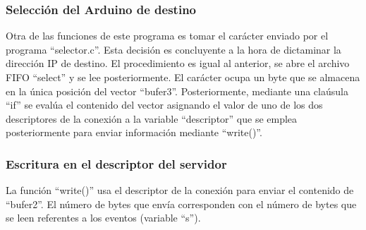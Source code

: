 \subsubsection{Selección del Arduino de destino}\label{s3_5_1_2}

Otra de las funciones de este programa es tomar el carácter enviado por el programa ``selector.c''. Esta decisión es concluyente a la hora de dictaminar la dirección IP de destino. El procedimiento es igual al anterior, se abre el archivo FIFO ``select'' y se lee posteriormente. El carácter ocupa un byte que se almacena en la única posición del vector ``bufer3''. Posteriormente, mediante una claúsula ``if'' se evalúa el contenido del vector asignando el valor de uno de los dos descriptores de la conexión a la variable ``descriptor'' que se emplea posteriormente para enviar información mediante ``write()''.


\subsubsection{Escritura en el descriptor del servidor}\label{s3_5_1_3}

La función ``write()'' usa el descriptor de la conexión para enviar el contenido de ``bufer2''. El número de bytes que envía corresponden con el número de bytes que se leen referentes a los eventos (variable ``s''). 

